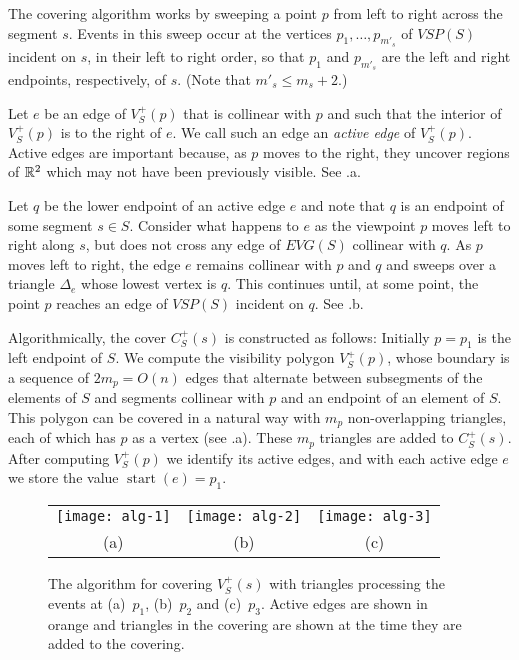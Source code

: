 \documentclass{patmorin}
\newcommand{\EVG}{\mathit{EVG}}
\newcommand{\VSP}{\mathit{VSP}}
\DeclareMathOperator{\start}{start}
\begin{document}
The covering algorithm works by sweeping a point $p$ from left to right
across the segment $s$.  Events in this sweep occur at the vertices
$p_1,\ldots,p_{m'_s}$ of $\VSP(S)$ incident on $s$, in their left to right
order, so that $p_1$ and $p_{m'_s}$ are the left and right endpoints,
respectively, of $s$.  (Note that $m'_s \le m_s + 2$.)

Let $e$ be an edge of $V^+_S(p)$ that is collinear with $p$ and such that the
interior of $V^+_S(p)$ is to the right of $e$. We call such an edge an
\emph{active edge} of $V^+_S(p)$.  Active edges are important because, as $p$
moves to the right, they uncover regions of $\mathbb{R}^2$ which may not have been
previously visible.  See .a.

Let $q$ be the lower endpoint of an active edge $e$ and note that $q$
is an endpoint of some segment $s\in S$. Consider what happens to $e$
as the viewpoint $p$ moves left to right along $s$, but does not cross
any edge of $\EVG(S)$ collinear with $q$.  As $p$ moves left to right,
the edge $e$ remains collinear with $p$ and $q$ and sweeps over a
triangle $\Delta_e$ whose lowest vertex is $q$.  This continues until,
at some point, the point $p$ reaches an edge of $\VSP(S)$ incident on $q$.
See .b.

Algorithmically, the cover $C^+_S(s)$ is constructed as follows: Initially
$p=p_1$ is the left endpoint of $S$.  We compute the visibility polygon
$V^+_S(p)$, whose boundary is a sequence of $2m_p=O(n)$ edges that alternate
between subsegments of the elements of $S$ and segments collinear with $p$
and an endpoint of an element of $S$.  This polygon can be covered in a
natural way with $m_p$ non-overlapping triangles, each of which has $p$
as a vertex (see .a). These $m_p$ triangles are added to
$C^+_S(s)$.  After computing $V^+_S(p)$ we identify its active edges, and with
each active edge $e$ we store the value $\start(e)=p_1$.

\begin{figure}
  \begin{center}
    \begin{tabular}{ccc}
      \texttt{[image: alg-1]} &
      \texttt{[image: alg-2]} &
      \texttt{[image: alg-3]} \\
      (a) & (b) & (c)
    \end{tabular}
  \end{center}
  \caption{The algorithm for covering $V^+_S(s)$ with triangles processing
           the events at (a)~$p_1$, (b)~$p_2$ and (c)~$p_3$.  
           Active edges are shown in orange and triangles in the covering
are shown at the time they are added to the covering.}
\end{figure}
\end{document}
